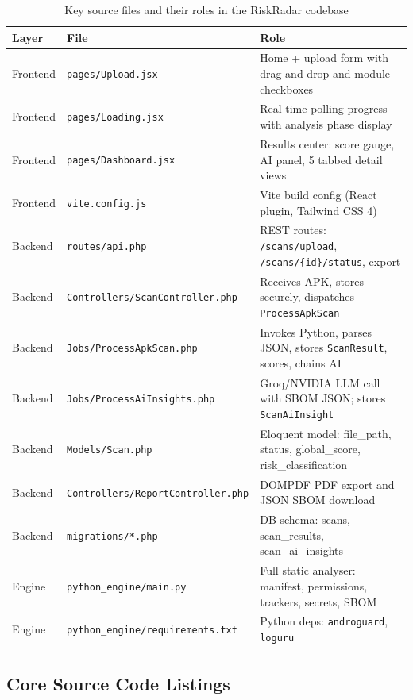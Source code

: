 \documentclass[3p,times]{elsarticle}
\begin{document}
\begin{table}[H]
\small
\renewcommand{\arraystretch}{1.3}
\begin{tabular}{|l|l|p{6.5cm}|}
\hline
\textbf{Layer} & \textbf{File} & \textbf{Role} \\
\hline
Frontend & \texttt{pages/Upload.jsx} &
  Home + upload form with drag-and-drop and module checkboxes \\
\hline
Frontend & \texttt{pages/Loading.jsx} &
  Real-time polling progress with analysis phase display \\
\hline
Frontend & \texttt{pages/Dashboard.jsx} &
  Results center: score gauge, AI panel, 5 tabbed detail views \\
\hline
Frontend & \texttt{vite.config.js} &
  Vite build config (React plugin, Tailwind CSS 4) \\
\hline
Backend & \texttt{routes/api.php} &
  REST routes: \texttt{/scans/upload}, \texttt{/scans/\{id\}/status}, export \\
\hline
Backend & \texttt{Controllers/ScanController.php} &
  Receives APK, stores securely, dispatches \texttt{ProcessApkScan} \\
\hline
Backend & \texttt{Jobs/ProcessApkScan.php} &
  Invokes Python, parses JSON, stores \texttt{ScanResult}, scores, chains AI \\
\hline
Backend & \texttt{Jobs/ProcessAiInsights.php} &
  Groq/NVIDIA LLM call with SBOM JSON; stores \texttt{ScanAiInsight} \\
\hline
Backend & \texttt{Models/Scan.php} &
  Eloquent model: file\_path, status, global\_score, risk\_classification \\
\hline
Backend & \texttt{Controllers/ReportController.php} &
  DOMPDF PDF export and JSON SBOM download \\
\hline
Backend & \texttt{migrations/*.php} &
  DB schema: scans, scan\_results, scan\_ai\_insights \\
\hline
Engine & \texttt{python\_engine/main.py} &
  Full static analyser: manifest, permissions, trackers, secrets, SBOM \\
\hline
Engine & \texttt{python\_engine/requirements.txt} &
  Python deps: \texttt{androguard}, \texttt{loguru} \\
\hline
\end{tabular}
\caption{Key source files and their roles in the RiskRadar codebase}
\end{table}

\subsection{Core Source Code Listings}
\end{document}
